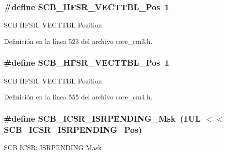 \subsubsection[{\texorpdfstring{S\+C\+B\+\_\+\+H\+F\+S\+R\+\_\+\+V\+E\+C\+T\+T\+B\+L\+\_\+\+Pos}{SCB_HFSR_VECTTBL_Pos}}]{\setlength{\rightskip}{0pt plus 5cm}\#define S\+C\+B\+\_\+\+H\+F\+S\+R\+\_\+\+V\+E\+C\+T\+T\+B\+L\+\_\+\+Pos~1}\hypertarget{group___c_m_s_i_s___s_c_b_ga77993da8de35adea7bda6a4475f036ab}{}\label{group___c_m_s_i_s___s_c_b_ga77993da8de35adea7bda6a4475f036ab}
S\+CB H\+F\+SR\+: V\+E\+C\+T\+T\+BL Position 

Definición en la línea 523 del archivo core\+\_\+cm3.\+h.

\subsubsection[{\texorpdfstring{S\+C\+B\+\_\+\+H\+F\+S\+R\+\_\+\+V\+E\+C\+T\+T\+B\+L\+\_\+\+Pos}{SCB_HFSR_VECTTBL_Pos}}]{\setlength{\rightskip}{0pt plus 5cm}\#define S\+C\+B\+\_\+\+H\+F\+S\+R\+\_\+\+V\+E\+C\+T\+T\+B\+L\+\_\+\+Pos~1}\hypertarget{group___c_m_s_i_s___s_c_b_ga77993da8de35adea7bda6a4475f036ab}{}\label{group___c_m_s_i_s___s_c_b_ga77993da8de35adea7bda6a4475f036ab}
S\+CB H\+F\+SR\+: V\+E\+C\+T\+T\+BL Position 

Definición en la línea 555 del archivo core\+\_\+cm4.\+h.

\subsubsection[{\texorpdfstring{S\+C\+B\+\_\+\+I\+C\+S\+R\+\_\+\+I\+S\+R\+P\+E\+N\+D\+I\+N\+G\+\_\+\+Msk}{SCB_ICSR_ISRPENDING_Msk}}]{\setlength{\rightskip}{0pt plus 5cm}\#define S\+C\+B\+\_\+\+I\+C\+S\+R\+\_\+\+I\+S\+R\+P\+E\+N\+D\+I\+N\+G\+\_\+\+Msk~(1\+U\+L $<$$<$ S\+C\+B\+\_\+\+I\+C\+S\+R\+\_\+\+I\+S\+R\+P\+E\+N\+D\+I\+N\+G\+\_\+\+Pos)}\hypertarget{group___c_m_s_i_s___s_c_b_ga056d74fd538e5d36d3be1f28d399c877}{}\label{group___c_m_s_i_s___s_c_b_ga056d74fd538e5d36d3be1f28d399c877}
S\+CB I\+C\+SR\+: I\+S\+R\+P\+E\+N\+D\+I\+NG Mask 

